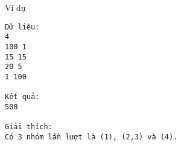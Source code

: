 Ví dụ
\begin{verbatim}
Dữ liệu:
4
100 1
15 15
20 5
1 100

Kết quả:
500

Giải thích: 
Có 3 nhóm lần lượt là (1), (2,3) và (4). 

\end{verbatim}
